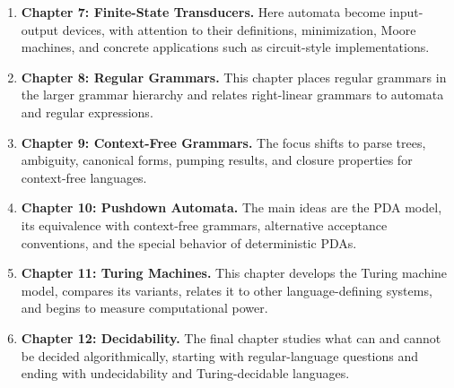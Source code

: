 \begin{enumerate}
\item \textbf{Chapter 7: Finite-State Transducers.} Here automata become
input-output devices, with attention to their definitions, minimization, Moore
machines, and concrete applications such as circuit-style implementations.

\item \textbf{Chapter 8: Regular Grammars.} This chapter places regular
grammars in the larger grammar hierarchy and relates right-linear grammars to
automata and regular expressions.

\item \textbf{Chapter 9: Context-Free Grammars.} The focus shifts to parse
trees, ambiguity, canonical forms, pumping results, and closure properties for
context-free languages.

\item \textbf{Chapter 10: Pushdown Automata.} The main ideas are the PDA model,
its equivalence with context-free grammars, alternative acceptance conventions,
and the special behavior of deterministic PDAs.

\item \textbf{Chapter 11: Turing Machines.} This chapter develops the Turing
machine model, compares its variants, relates it to other language-defining
systems, and begins to measure computational power.

\item \textbf{Chapter 12: Decidability.} The final chapter studies what can and
cannot be decided algorithmically, starting with regular-language questions and
ending with undecidability and Turing-decidable languages.
\end{enumerate}
